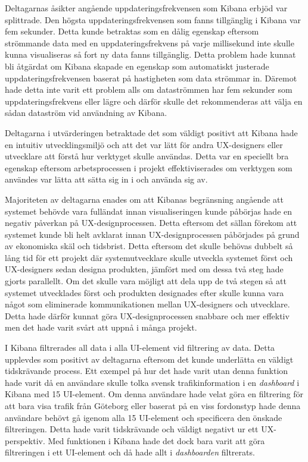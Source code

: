 \documentclass[12pt]{kththesis}
\begin{document}
Deltagarnas åsikter angående uppdateringsfrekvensen som Kibana erbjöd var splittrade. Den högsta uppdateringsfrekvensen som fanns tillgänglig i Kibana var fem sekunder. Detta kunde betraktas som en dålig egenskap eftersom strömmande data med en uppdateringsfrekvens på varje millisekund inte skulle kunna visualiseras så fort ny data fanns tillgänglig. Detta problem hade kunnat bli åtgärdat om Kibana skapade en egenskap som automatiskt justerade uppdateringsfrekvensen baserat på hastigheten som data strömmar in. Däremot hade detta inte varit ett problem alls om dataströmmen har fem sekunder som uppdateringsfrekvens eller lägre och därför skulle det rekommenderas att välja en sådan dataström vid användning av Kibana. 

Deltagarna i utvärderingen betraktade det som väldigt positivt att Kibana hade en intuitiv utvecklingsmiljö och att det var lätt för andra UX-designers eller utvecklare att förstå hur verktyget skulle användas. Detta var en speciellt bra egenskap eftersom arbetsprocessen i projekt effektiviserades om verktygen som användes var lätta att sätta sig in i och använda sig av. 

Majoriteten av deltagarna enades om att Kibanas begränsning angående att systemet behövde vara fulländat innan visualiseringen kunde påbörjas hade en negativ påverkan på UX-designprocessen. Detta eftersom det sällan förekom att systemet kunde bli helt avklarat innan UX-designprocessen påbörjades på grund av ekonomiska skäl och tidsbrist. Detta eftersom det skulle behövas dubbelt så lång tid för ett projekt där systemutvecklare skulle utveckla systemet först och UX-designers sedan designa produkten, jämfört med om dessa två steg hade gjorts parallellt. Om det skulle vara möjligt att dela upp de två stegen så att systemet utvecklades först och produkten designades efter skulle kunna vara något som eliminerade kommunikationen mellan UX-designers och utvecklare. Detta hade därför kunnat göra UX-designprocessen snabbare och mer effektiv men det hade varit svårt att uppnå i många projekt.

I Kibana filtrerades all data i alla UI-element vid filtrering av data. Detta upplevdes som positivt av deltagarna eftersom det kunde underlätta en väldigt tidskrävande process. Ett exempel på hur det hade varit utan denna funktion hade varit då en användare skulle tolka svensk trafikinformation i en \textit{dashboard} i Kibana med 15 UI-element. Om denna användare hade velat göra en filtrering för att bara visa trafik från Göteborg eller baserat på en viss fordonstyp hade denna användare behövt gå igenom alla 15 UI-element och specificera den önskade filtreringen. Detta hade varit tidskrävande och väldigt negativt ur ett UX-perspektiv. Med funktionen i Kibana hade det dock bara varit att göra filtreringen i ett UI-element och då hade allt i \textit{dashboarden} filtrerats. 
\end{document}
